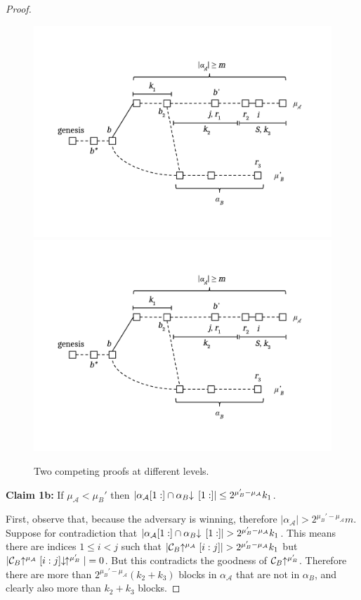 \begin{proof}
    \begin{figure}
        \caption{Two competing proofs at different levels.}
        \centering
        \iftwocolumn
          \includegraphics[width=\columnwidth,keepaspectratio]{figures/security-proof-chain.pdf}
        \else
          \includegraphics[width=0.7 \columnwidth,keepaspectratio]{figures/security-proof-chain.pdf}
        \fi
        \label{fig.sec-comparison}
    \end{figure}

    \textbf{Claim 1b: } If $\mu_\mathcal{A} < \mu_B'$ then
    $|\alpha_\mathcal{A}[1:] \cap \alpha_B\negthickspace\downarrow\,[1:]| \leq 2^{\mu_B' - \mu_\mathcal{A}} k_1$.

    First, observe that, because the adversary is winning, therefore
    $|\alpha_\mathcal{A}| > 2^{\mu_B' - \mu_\mathcal{A}}m$.
    Suppose for contradiction that $|\alpha_\mathcal{A}[1:] \cap
    \alpha_B\negthickspace\downarrow\,[1:]| > 2^{\mu_B' - \mu_\mathcal{A}} k_1$. This means
    there are indices $1 \leq i < j$ such that
    $|\mathcal{C}_B\negthickspace\uparrow^{\mu_\mathcal{A}}[i:j]| > 2^{\mu_B' - \mu_\mathcal{A}}
    k_1$ but
    $|\mathcal{C}_B\negthickspace\uparrow^{\mu_\mathcal{A}}[i:j]\negthickspace\downarrow\,\negthickspace\uparrow^{\mu_B'}| = 0$.
    But this contradicts the goodness of $\mathcal{C}_B\negthickspace\uparrow^{\mu_B'}$. Therefore
    there are more than $2^{\mu_B' - \mu_\mathcal{A}}(k_2 + k_3)$ blocks in
    $\alpha_\mathcal{A}$ that are not in $\alpha_B$, and clearly also more than $k_2 + k_3$ blocks.


\end{proof}
